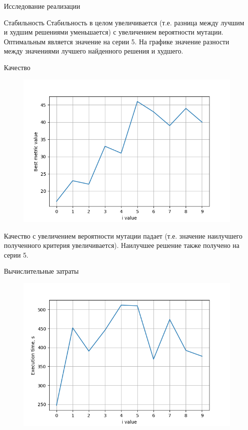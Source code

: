 \documentclass[a4paper,12pt,titlepage,final]{article}
\begin{document}
\begin{section}{Исследование реализации}
\begin{subsection}{Стабильность}
    Стабильность в целом увеличивается (т.е. разница между лучшим и худшим решениями уменьшается) с увеличением вероятности мутации. Оптимальным является значение на серии 5. На графике значение разности между значениями лучшего найденного решения и худшего.
    \end{subsection}

    \newpage

    \begin{subsection}{Качество}
    
    \begin{figure}[H]
    	\includegraphics[width=17cm]{2.png}
    	\centering
    	\label{pic:1}
    \end{figure}

    Качество с увеличением вероятности мутации падает (т.е. значение наилучшего полученного критерия увеличивается). Наилучшее решение также получено на серии 5.
    \end{subsection}

    \newpage

    \begin{subsection}{Вычислительные затраты}

    \begin{figure}[H]
    	\includegraphics[width=17cm]{3.png}
    	\label{pic:3}
    \end{figure}


\end{subsection}
\end{section}
\end{document}
